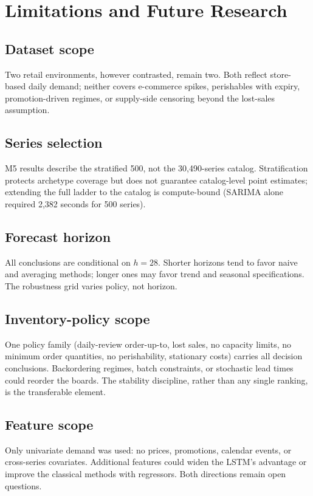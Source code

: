 \section{Limitations and Future Research}
\label{sec:limits}

\subsection{Dataset scope}
\label{sec:l-data}
Two retail environments, however contrasted, remain two. Both reflect
store-based daily demand; neither covers e-commerce spikes, perishables with
expiry, promotion-driven regimes, or supply-side censoring beyond the
lost-sales assumption.

\subsection{Series selection}
\label{sec:l-series}
M5 results describe the stratified 500, not the 30,490-series catalog.
Stratification protects archetype coverage but does not guarantee
catalog-level point estimates; extending the full ladder to the catalog is
compute-bound (SARIMA alone required 2,382 seconds for 500 series).

\subsection{Forecast horizon}
\label{sec:l-horizon}
All conclusions are conditional on $h=28$. Shorter horizons tend to favor
naive and averaging methods; longer ones may favor trend and seasonal
specifications. The robustness grid varies policy, not horizon.

\subsection{Inventory-policy scope}
\label{sec:l-policy}
One policy family (daily-review order-up-to, lost sales, no capacity limits,
no minimum order quantities, no perishability, stationary costs) carries all
decision conclusions. Backordering regimes, batch constraints, or stochastic
lead times could reorder the boards. The stability discipline, rather than
any single ranking, is the transferable element.

\subsection{Feature scope}
\label{sec:l-features}
Only univariate demand was used: no prices, promotions, calendar events, or
cross-series covariates. Additional features could widen the LSTM's
advantage or improve the classical methods with regressors. Both directions
remain open questions.

